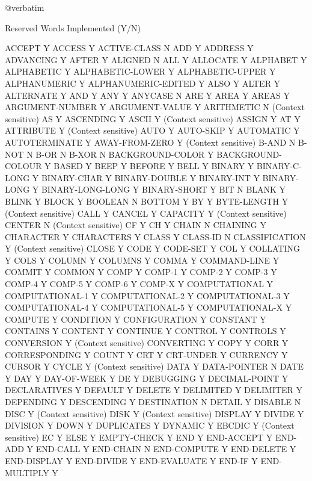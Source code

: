@verbatim

Reserved Words			Implemented (Y/N)

ACCEPT				Y
ACCESS				Y
ACTIVE-CLASS			N
ADD				Y
ADDRESS				Y
ADVANCING			Y
AFTER				Y
ALIGNED				N
ALL				Y
ALLOCATE			Y
ALPHABET			Y
ALPHABETIC			Y
ALPHABETIC-LOWER		Y
ALPHABETIC-UPPER		Y
ALPHANUMERIC			Y
ALPHANUMERIC-EDITED		Y
ALSO				Y
ALTER				Y
ALTERNATE			Y
AND				Y
ANY				Y
ANYCASE				N
ARE				Y
AREA				Y
AREAS				Y
ARGUMENT-NUMBER			Y
ARGUMENT-VALUE			Y
ARITHMETIC			N (Context sensitive)
AS				Y
ASCENDING			Y
ASCII				Y (Context sensitive)
ASSIGN				Y
AT				Y
ATTRIBUTE			Y (Context sensitive)
AUTO				Y
AUTO-SKIP			Y
AUTOMATIC			Y
AUTOTERMINATE			Y
AWAY-FROM-ZERO			Y (Context sensitive)
B-AND				N
B-NOT				N
B-OR				N
B-XOR				N
BACKGROUND-COLOR		Y
BACKGROUND-COLOUR		Y
BASED				Y
BEEP				Y
BEFORE				Y
BELL				Y
BINARY				Y
BINARY-C-LONG			Y
BINARY-CHAR			Y
BINARY-DOUBLE			Y
BINARY-INT			Y
BINARY-LONG			Y
BINARY-LONG-LONG		Y
BINARY-SHORT			Y
BIT				N
BLANK				Y
BLINK				Y
BLOCK				Y
BOOLEAN				N
BOTTOM				Y
BY				Y
BYTE-LENGTH			Y (Context sensitive)
CALL				Y
CANCEL				Y
CAPACITY			Y (Context sensitive)
CENTER				N (Context sensitive)
CF				Y
CH				Y
CHAIN				N
CHAINING			Y
CHARACTER			Y
CHARACTERS			Y
CLASS				Y
CLASS-ID			N
CLASSIFICATION			Y (Context sensitive)
CLOSE				Y
CODE				Y
CODE-SET			Y
COL				Y
COLLATING			Y
COLS				Y
COLUMN				Y
COLUMNS				Y
COMMA				Y
COMMAND-LINE			Y
COMMIT				Y
COMMON				Y
COMP				Y
COMP-1				Y
COMP-2				Y
COMP-3				Y
COMP-4				Y
COMP-5				Y
COMP-6				Y
COMP-X				Y
COMPUTATIONAL			Y
COMPUTATIONAL-1			Y
COMPUTATIONAL-2			Y
COMPUTATIONAL-3			Y
COMPUTATIONAL-4			Y
COMPUTATIONAL-5			Y
COMPUTATIONAL-X			Y
COMPUTE				Y
CONDITION			Y
CONFIGURATION			Y
CONSTANT			Y
CONTAINS			Y
CONTENT				Y
CONTINUE			Y
CONTROL				Y
CONTROLS			Y
CONVERSION			Y (Context sensitive)
CONVERTING			Y
COPY				Y
CORR				Y
CORRESPONDING			Y
COUNT				Y
CRT				Y
CRT-UNDER			Y
CURRENCY			Y
CURSOR				Y
CYCLE				Y (Context sensitive)
DATA				Y
DATA-POINTER			N
DATE				Y
DAY				Y
DAY-OF-WEEK			Y
DE				Y
DEBUGGING			Y
DECIMAL-POINT			Y
DECLARATIVES			Y
DEFAULT				Y
DELETE				Y
DELIMITED			Y
DELIMITER			Y
DEPENDING			Y
DESCENDING			Y
DESTINATION			N
DETAIL				Y
DISABLE				N
DISC				Y (Context sensitive)
DISK				Y (Context sensitive)
DISPLAY				Y
DIVIDE				Y
DIVISION			Y
DOWN				Y
DUPLICATES			Y
DYNAMIC				Y
EBCDIC				Y (Context sensitive)
EC				Y
ELSE				Y
EMPTY-CHECK			Y
END				Y
END-ACCEPT			Y
END-ADD				Y
END-CALL			Y
END-CHAIN			N
END-COMPUTE			Y
END-DELETE			Y
END-DISPLAY			Y
END-DIVIDE			Y
END-EVALUATE			Y
END-IF				Y
END-MULTIPLY			Y
